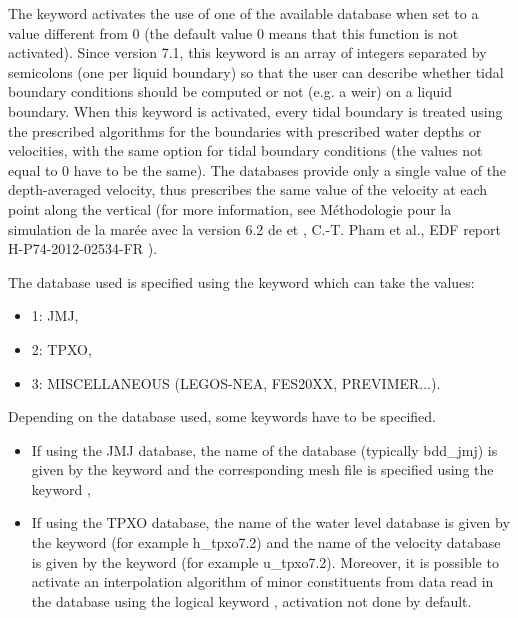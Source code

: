 The keyword  activates the use of
one of the available database when set to a value different from 0
(the default value 0 means that this function is not activated). 
Since version 7.1, this keyword is an array of integers separated by semicolons
(one per liquid boundary) so that the user can describe whether tidal boundary
conditions should be computed or not (e.g. a weir) on a liquid boundary. 
When this keyword is activated, every tidal
boundary is treated using the prescribed algorithms for the boundaries with
prescribed water depths or velocities, with the same option for tidal boundary
conditions (the values not equal to 0 have to be the same).
The databases provide only a single value of the
depth-averaged velocity, thus  prescribes the same value of the
velocity at each point along the vertical (for more information, see
Méthodologie pour la simulation de la marée avec la version 6.2 de 
et , C.-T. Pham et al., EDF report H-P74-2012-02534-FR
\cite{Pham2012}).

The database used is specified using the keyword  which
can take the values:

\begin{itemize}
\item 1: JMJ,

\item 2: TPXO,

\item 3: MISCELLANEOUS (LEGOS-NEA, FES20XX, PREVIMER...).
\end{itemize}

Depending on the database used, some keywords have to be specified.

\begin{itemize}
\item If using the JMJ database, the name of the database (typically bdd\_jmj)
is given by the keyword  and the corresponding
mesh file is specified using the keyword ,

\item If using the TPXO database, the name of the water level database is given
by the keyword  (for example h\_tpxo7.2) and
the name of the velocity database is given by the keyword  (for example u\_tpxo7.2). Moreover, it is possible to
activate an interpolation algorithm of minor constituents from data read in the
database using the logical keyword ,
activation not done by default.
\end{itemize}

